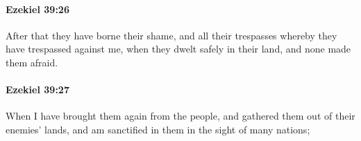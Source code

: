 		\paragraph{Ezekiel 39:26} %
			\label{EZEKIEL-39-26}

			After that they have borne their shame, and all their trespasses whereby they have trespassed against me, when they dwelt safely in their land, and none made them afraid.


		\paragraph{Ezekiel 39:27} %
			\label{EZEKIEL-39-27}

			When I have brought them again from the people, and gathered them out of their enemies’ lands, and am sanctified in them in the sight of many nations;


